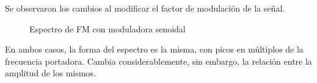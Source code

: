 \documentclass[../../labo_tp5_main.tex]{subfiles}
\begin{document}
Se observaron los cambios al modificar el factor de modulaci\'on de la se\~nal.

\begin{figure}[H]
	\centering
	\caption{Espectro de FM con moduladora senoidal}
\end{figure}

En ambos casos, la forma del espectro es la misma, con picos en m\'ultiplos de la frecuencia portadora. Cambia considerablemente, sin embargo, la relaci\'on entre la amplitud de los mismos.\par
\end{document}

